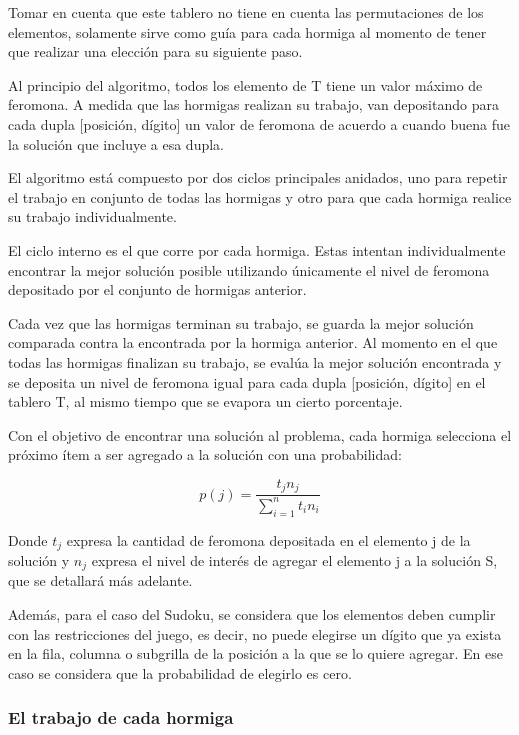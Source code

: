 \documentclass[a4paper,spanish]{article}
\begin{document}
Tomar en cuenta que este tablero no tiene en cuenta las permutaciones de los elementos, solamente sirve como guía 
para cada hormiga al momento de tener que realizar una elección para su siguiente paso.

Al principio del algoritmo, todos los elemento de T tiene un valor máximo de feromona. A medida que las hormigas
realizan su trabajo, van depositando para cada dupla [posición, dígito] un valor de feromona de acuerdo a cuando buena fue
la solución que incluye a esa dupla.

El algoritmo está compuesto por dos ciclos principales anidados, uno para repetir el trabajo en conjunto 
de todas las hormigas y otro para que cada hormiga realice su trabajo individualmente.

El ciclo interno es el que corre por cada hormiga. Estas intentan individualmente encontrar 
la mejor solución posible utilizando únicamente el nivel de feromona depositado por el conjunto de hormigas anterior. 

Cada vez que las hormigas terminan su trabajo, se guarda la mejor solución comparada contra la encontrada por la hormiga anterior. 
Al momento en el que todas las hormigas finalizan su trabajo, se evalúa la mejor solución encontrada y se deposita un nivel de 
feromona igual para cada dupla [posición, dígito] en el tablero T, al mismo tiempo que se evapora un cierto porcentaje.

Con el objetivo de encontrar una solución al problema, cada hormiga selecciona el próximo ítem 
a ser agregado a la solución con una probabilidad:

\begin{equation}
	p(j) = \dfrac{t_j n_j}{\sum\limits_{i=1}^n t_i n_i}
\end{equation}

Donde $t_j$ expresa la cantidad de feromona depositada en el elemento j de la solución y $n_j$ expresa el nivel de interés de agregar 
el elemento j a la solución S, que se detallará más adelante.

Además, para el caso del Sudoku, se considera que los elementos deben cumplir con las restricciones del juego, es decir, 
no puede elegirse un dígito que ya exista en la fila, columna o subgrilla de la posición a la que se lo quiere agregar. 
En ese caso se considera que la probabilidad de elegirlo es cero.

\subsubsection{El trabajo de cada hormiga}
\end{document}
